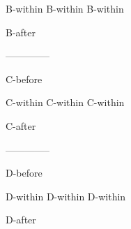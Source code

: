 \begingroup\obeyalllines{}B-within
B-within
B-within
\endgroup{}\par

B-after\par
--------------


C-before
\begingroup\obeyalllines{}\par

C-within
C-within
C-within\par

\endgroup{}C-after\par
--------------


D-before\par

\begingroup\obeyalllines{}\par

D-within
D-within
D-within\par

\endgroup{}\par

D-after\par
